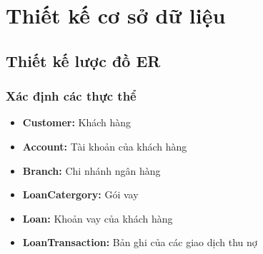 \documentclass{article}
\begin{document}
\section{Thiết kế cơ sở dữ liệu}
\subsection{Thiết kế lược đồ ER}
\subsubsection{Xác định các thực thể}
\begin{itemize}
    \item \textbf{Customer:} Khách hàng
    \item \textbf{Account:} Tài khoản của khách hàng
    \item \textbf{Branch:} Chi nhánh ngân hàng
    \item \textbf{LoanCatergory:} Gói vay
    \item \textbf{Loan:} Khoản vay của khách hàng
    \item \textbf{LoanTransaction:} Bản ghi của các giao dịch thu nợ
\end{itemize}
\end{document}
